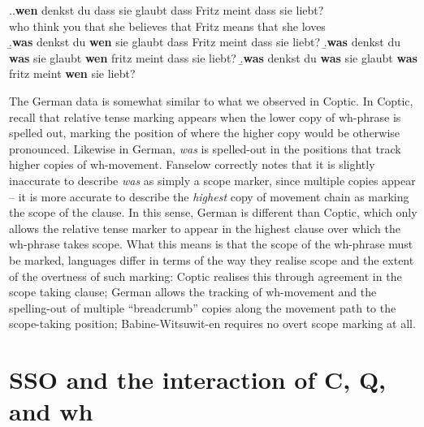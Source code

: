 \documentclass{glossa}
\begin{document}
\ex.\label{wh.270}\ag.\label{wh.270a}\textbf{wen} denkst du dass sie glaubt dass Fritz meint dass sie liebt?\\
   who think you that she believes that Fritz means that she loves\\
   \b.\textbf{was} denkst du \textbf{wen} sie glaubt dass Fritz meint dass sie liebt?
   \b.\textbf{was} denkst du \textbf{was} sie glaubt \textbf{wen} fritz meint dass sie liebt?
   \b.\textbf{was} denkst du \textbf{was} sie glaubt \textbf{was} fritz meint \textbf{wen} sie liebt?

The German data is somewhat similar to what we observed in Coptic. In Coptic, recall that relative tense marking appears when the lower copy of wh-phrase is spelled out, marking the position of where the higher copy would be otherwise pronounced. Likewise in German, \textit{was} is spelled-out in the positions that track higher copies of wh-movement. Fanselow correctly notes that it is slightly inaccurate to describe \textit{was} as simply a scope marker, since multiple copies appear -- it is more accurate to describe the \textit{highest} copy of movement chain as marking the scope of the clause. In this sense, German is different than Coptic, which only allows the relative tense marker to appear in the highest clause over which the wh-phrase takes scope. What this means is that the scope of the wh-phrase must be marked, languages differ in terms of the way they realise scope and the extent of the overtness of such marking: Coptic realises this through agreement in the scope taking clause; German allows the tracking of wh-movement and the spelling-out of multiple ``breadcrumb'' copies along the movement path to the scope-taking position; Babine-Witsuwit-en requires no overt scope marking at all.

\section{SSO and the interaction of C, Q, and wh}
\end{document}
